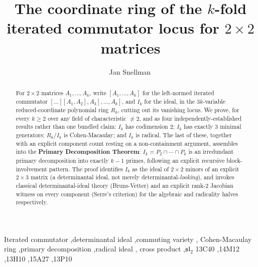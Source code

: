 \begin{frontmatter}

\title{The coordinate ring of the $k$-fold iterated commutator locus for $2 \times 2$
  matrices}

\author{Jan Snellman\,}


\begin{abstract}
  For $2 \times 2$ matrices $A_1,\dots,A_k$, write $[A_1,\dots,A_k]$ for the
  left-normed iterated commutator $[\dots[[A_1,A_2],A_3],\dots,A_k]$, and $I_k$
  for the ideal, in the $3k$-variable reduced-coordinate polynomial ring $R_k$,
  cutting out its vanishing locus. We prove, for every $k \geq 2$ over any field
  of characteristic $\neq 2$, and as four independently-established results
  rather than one bundled claim: $I_k$ has codimension 2; $I_k$ has exactly 3
  minimal generators; $R_k / I_k$ is Cohen-Macaulay; and $I_k$ is radical. The
  last of these, together with an explicit component count resting on a
  non-containment argument, assembles into the \textbf{Primary Decomposition
  Theorem}: $I_k = P_2 \cap \cdots \cap P_k$ is an irredundant primary
  decomposition into exactly $k-1$ primes, following an explicit recursive
  block-involvement pattern. The proof identifies $I_k$ as the ideal of
  $2 \times 2$ minors of an explicit $2 \times 3$ matrix (a determinantal ideal,
  not merely determinantal-\textit{looking}), and invokes classical
  determinantal-ideal theory (Bruns-Vetter) and an explicit rank-2 Jacobian
  witness on every component (Serre's criterion) for the algebraic and
  radicality halves respectively.
\end{abstract}

\begin{keyword}
  Iterated commutator \sep determinantal ideal \sep commuting variety \sep
  Cohen-Macaulay ring \sep primary decomposition \sep radical ideal \sep
  cross product \sep $\mathfrak{sl}_2$
  \MSC[2020] 13C40 \sep 14M12 \sep 13H10 \sep 15A27 \sep 13P10
\end{keyword}

\end{frontmatter}
